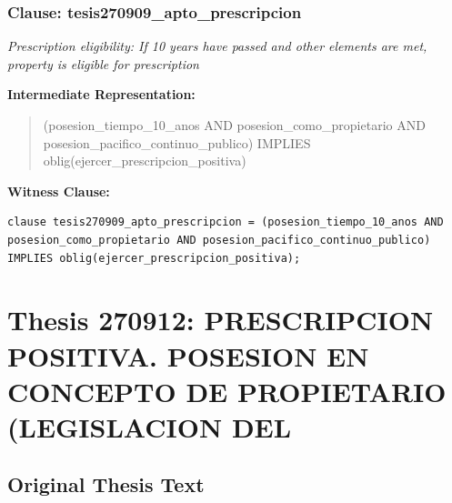 \documentclass[11pt,a4paper]{article}
\begin{document}
\subsubsection{Clause: tesis270909\_apto\_prescripcion}

\textit{Prescription eligibility: If 10 years have passed and other elements are met, property is eligible for prescription}

\textbf{Intermediate Representation:}

\begin{quote}
(posesion\_tiempo\_10\_anos AND posesion\_como\_propietario AND posesion\_pacifico\_continuo\_publico) IMPLIES oblig(ejercer\_prescripcion\_positiva)
\end{quote}

\textbf{Witness Clause:}

\begin{lstlisting}[style=witnessstyle, language=Witness]
clause tesis270909_apto_prescripcion = (posesion_tiempo_10_anos AND posesion_como_propietario AND posesion_pacifico_continuo_publico) IMPLIES oblig(ejercer_prescripcion_positiva);
\end{lstlisting}

\newpage

\section{Thesis 270912: PRESCRIPCION POSITIVA. POSESION EN CONCEPTO DE PROPIETARIO (LEGISLACION DEL}
\label{thesis:270912}

\subsection{Original Thesis Text}
\end{document}
